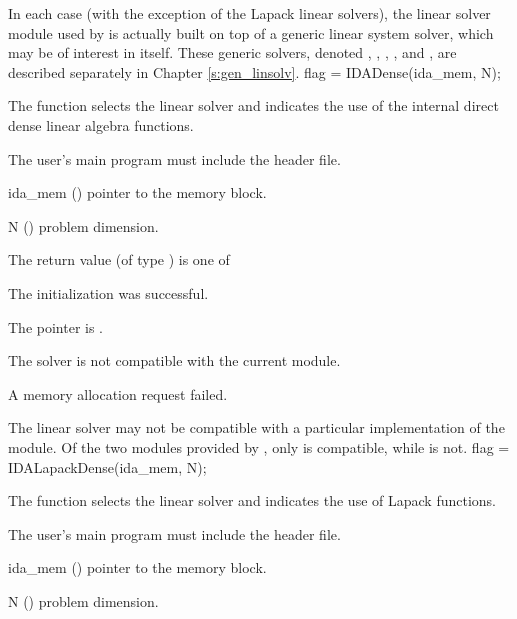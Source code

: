 In each case (with the exception of the Lapack linear solvers),
the linear solver module used by {\ida} is actually built on top of a generic
linear system solver, which may be of interest in itself.  These
generic solvers, denoted {\dense}, {\band}, {\spgmr}, {\spbcg}, and {\sptfqmr}, are
described separately in Chapter \ref{s:gen_linsolv}.
{
  flag = IDADense(ida\_mem, N);
}
{
  The function  selects the {\idadense} linear solver and indicates
  the use of the internal direct dense linear algebra functions. 

  The user's main program must include the  header file.
}
{
  \begin{args}
  \item[ida\_mem] ()
    pointer to the {\ida} memory block.
  \item[N] ()
    problem dimension.
  \end{args}
}
{
  The return value  (of type ) is one of
  \begin{args}
  \item[\Id{IDADLS\_SUCCESS}] 
    The {\idadense} initialization was successful.
  \item[\Id{IDADLS\_MEM\_NULL}]
    The  pointer is .
  \item[\Id{IDADLS\_ILL\_INPUT}]
    The {\idadense} solver is not compatible with the current {\nvector} module.
  \item[\Id{IDADLS\_MEM\_FAIL}]
    A memory allocation request failed.
  \end{args}
}
{
  The {\idadense} linear solver may not be compatible with a particular
  implementation of the {\nvector} module. 
  Of the two {\nvector} modules provided by {\sundials}, only {\nvecs} is 
  compatible, while {\nvecp} is not.
}
{
  flag = IDALapackDense(ida\_mem, N);
}
{
  The function  selects the {\idadense} linear solver and 
  indicates the use of Lapack functions. 

  The user's main program must include the  header file.
}
{
  \begin{args}
  \item[ida\_mem] ()
    pointer to the {\ida} memory block.
  \item[N] ()
    problem dimension.
  \end{args}
}
